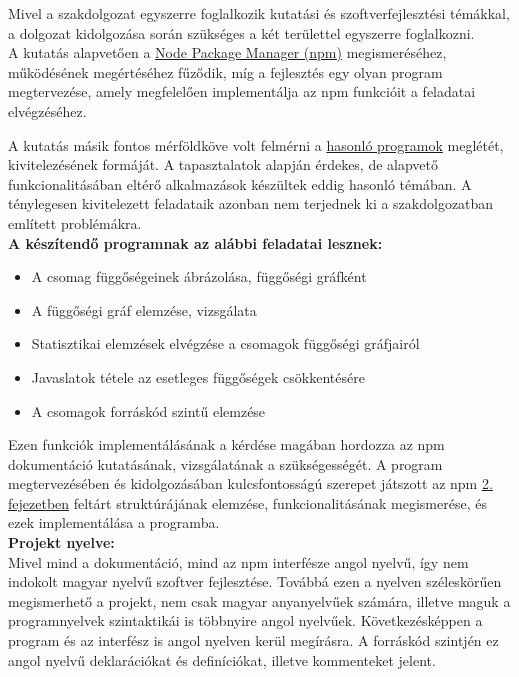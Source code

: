 

Mivel a szakdolgozat egyszerre foglalkozik kutatási és szoftverfejlesztési témákkal, a dolgozat kidolgozása során szükséges a két területtel egyszerre foglalkozni.\\ 

A kutatás alapvetően a \hyperlink{chapter.2}{Node Package Manager (npm)} megismeréséhez, működésének megértéséhez fűződik, míg a fejlesztés egy olyan program megtervezése, amely megfelelően implementálja az npm funkcióit a feladatai elvégzéséhez.

A kutatás másik fontos mérföldköve volt felmérni a \hyperlink{section.3.2}{hasonló programok} meglétét, kivitelezésének formáját. A tapasztalatok alapján érdekes, de alapvető funkcionalitásában eltérő alkalmazások készültek eddig hasonló témában. A ténylegesen kivitelezett feladataik azonban nem terjednek ki a szakdolgozatban említett problémákra.\\

\textbf{A készítendő programnak az alábbi feladatai lesznek:}
\begin{itemize}
	\item A csomag függőségeinek ábrázolása, függőségi gráfként
	\item A függőségi gráf elemzése, vizsgálata
	\item Statisztikai elemzések elvégzése a csomagok függőségi gráfjairól
	\item Javaslatok tétele az esetleges függőségek csökkentésére
	\item A csomagok forráskód szintű elemzése
\end{itemize}

Ezen funkciók implementálásának a kérdése magában hordozza az npm dokumentáció kutatásának, vizsgálatának a szükségességét.
A program megtervezésében és kidolgozásában kulcsfontosságú szerepet játszott az npm \hyperlink{chapter.2}{2. fejezetben} feltárt struktúrájának elemzése, funkcionalitásának megismerése, és ezek implementálása a programba.\\

\textbf{Projekt nyelve:}\\

Mivel mind a dokumentáció, mind az npm interfésze angol nyelvű, így nem indokolt magyar nyelvű szoftver fejlesztése. Továbbá ezen a nyelven széleskörűen megismerhető a projekt, nem csak magyar anyanyelvűek számára, illetve maguk a programnyelvek szintaktikái is többnyire angol nyelvűek. Következésképpen a program és az interfész is angol nyelven kerül megírásra. A forráskód szintjén ez angol nyelvű deklarációkat és definíciókat, illetve kommenteket jelent. 

